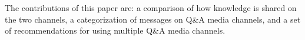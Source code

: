 \documentclass{sig-alternate-05-2015}
\begin{document}
	The contributions of this paper are:
	    a comparison of how knowledge is shared on the two channels,
		a categorization of messages on Q\&A media channels, and
        a set of recommendations for using multiple Q\&A media channels.


\end{document}
